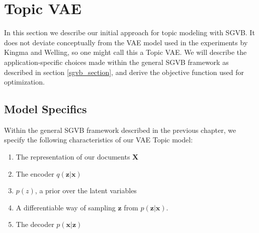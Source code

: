 \documentclass{report}
\begin{document}
\section{Topic VAE}\label{TopicVAE}

In this section we describe our initial approach for topic modeling with SGVB. It does not deviate conceptually from the VAE model used in the experiments by Kingma and Welling\cite{kingma2013auto}, so one might call this a Topic VAE. We will describe the application-specific choices made within the general SGVB framework as described in section \ref{sgvb_section}, and derive the objective function used for optimization. 

\subsection{Model Specifics}

Within the general SGVB framework described in the previous chapter, we specify the following characteristics of our VAE Topic model:

\begin{enumerate}
	\item The representation of our documents $\mathbf{X}$
	\item The encoder $q(\mathbf{z}|\mathbf{x})$
	\item $p(z)$, a prior  over the latent variables
	\item A differentiable way of sampling $\mathbf{z}$ from $p(\mathbf{z}|\mathbf{x})$. 
	\item The decoder $p(\mathbf{x}|\mathbf{z})$
\end{enumerate}
\end{document}
